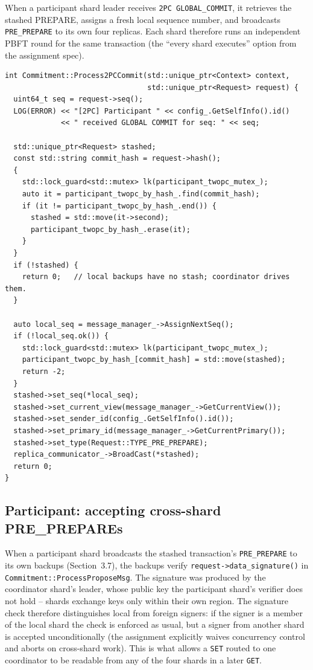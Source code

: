 \documentclass[11pt]{article}
\begin{document}
When a participant shard leader receives \texttt{2PC GLOBAL\_COMMIT}, it
retrieves the stashed PREPARE, assigns a fresh local sequence number, and
broadcasts \texttt{PRE\_PREPARE} to its own four replicas. Each shard
therefore runs an independent PBFT round for the same transaction (the
``every shard executes'' option from the assignment spec).

\begin{lstlisting}[style=cppstyle,caption={\texttt{platform/consensus/ordering/pbft/commitment.cpp} -- \texttt{Process2PCCommit}: drive local PBFT from the stashed PREPARE.}]
int Commitment::Process2PCCommit(std::unique_ptr<Context> context,
                                 std::unique_ptr<Request> request) {
  uint64_t seq = request->seq();
  LOG(ERROR) << "[2PC] Participant " << config_.GetSelfInfo().id()
             << " received GLOBAL COMMIT for seq: " << seq;

  std::unique_ptr<Request> stashed;
  const std::string commit_hash = request->hash();
  {
    std::lock_guard<std::mutex> lk(participant_twopc_mutex_);
    auto it = participant_twopc_by_hash_.find(commit_hash);
    if (it != participant_twopc_by_hash_.end()) {
      stashed = std::move(it->second);
      participant_twopc_by_hash_.erase(it);
    }
  }
  if (!stashed) {
    return 0;   // local backups have no stash; coordinator drives them.
  }

  auto local_seq = message_manager_->AssignNextSeq();
  if (!local_seq.ok()) {
    std::lock_guard<std::mutex> lk(participant_twopc_mutex_);
    participant_twopc_by_hash_[commit_hash] = std::move(stashed);
    return -2;
  }
  stashed->set_seq(*local_seq);
  stashed->set_current_view(message_manager_->GetCurrentView());
  stashed->set_sender_id(config_.GetSelfInfo().id());
  stashed->set_primary_id(message_manager_->GetCurrentPrimary());
  stashed->set_type(Request::TYPE_PRE_PREPARE);
  replica_communicator_->BroadCast(*stashed);
  return 0;
}
\end{lstlisting}

\subsection{Participant: accepting cross-shard PRE\_PREPAREs}

When a participant shard broadcasts the stashed transaction's
\texttt{PRE\_PREPARE} to its own backups (Section~3.7), the backups
verify \texttt{request->data\_signature()} in
\texttt{Commitment::ProcessProposeMsg}. The signature was produced by
the coordinator shard's leader, whose public key the participant
shard's verifier does not hold -- shards exchange keys only within
their own region. The signature check therefore distinguishes
local from foreign signers: if the signer is a member of the local
shard the check is enforced as usual, but a signer from another shard
is accepted unconditionally (the assignment explicitly waives
concurrency control and aborts on cross-shard work). This is what
allows a \texttt{SET} routed to one coordinator to be readable from
any of the four shards in a later \texttt{GET}.
\end{document}

